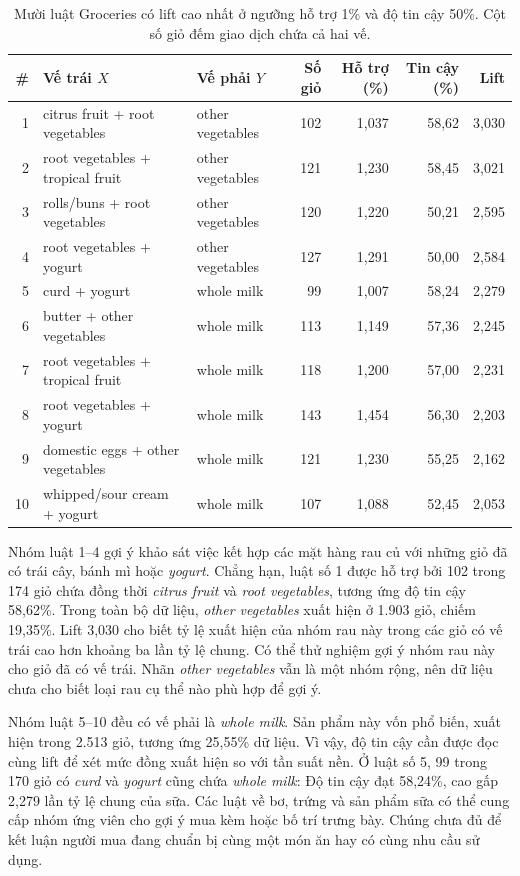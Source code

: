 \begin{table}[!t]
\caption{Mười luật Groceries có lift cao nhất ở ngưỡng hỗ trợ 1\% và độ tin cậy 50\%. Cột số giỏ đếm giao dịch chứa cả hai vế.}\label{tab:rules}
\centering\footnotesize
\begin{tabular}{rp{}p{}rrrr}\toprule
\# & Vế trái $X$ & Vế phải $Y$ & Số giỏ & Hỗ trợ (\%) & Tin cậy (\%) & Lift \\\midrule
1 & citrus fruit + root vegetables & other vegetables & 102 & 1,037 & 58,62 & 3,030 \\
2 & root vegetables + tropical fruit & other vegetables & 121 & 1,230 & 58,45 & 3,021 \\
3 & rolls/buns + root vegetables & other vegetables & 120 & 1,220 & 50,21 & 2,595 \\
4 & root vegetables + yogurt & other vegetables & 127 & 1,291 & 50,00 & 2,584 \\
5 & curd + yogurt & whole milk & 99 & 1,007 & 58,24 & 2,279 \\
6 & butter + other vegetables & whole milk & 113 & 1,149 & 57,36 & 2,245 \\
7 & root vegetables + tropical fruit & whole milk & 118 & 1,200 & 57,00 & 2,231 \\
8 & root vegetables + yogurt & whole milk & 143 & 1,454 & 56,30 & 2,203 \\
9 & domestic eggs + other vegetables & whole milk & 121 & 1,230 & 55,25 & 2,162 \\
10 & whipped/sour cream + yogurt & whole milk & 107 & 1,088 & 52,45 & 2,053 \\
\bottomrule\end{tabular}
\end{table}

Nhóm luật 1--4 gợi ý khảo sát việc kết hợp các mặt hàng rau củ với
những giỏ đã có trái cây, bánh mì hoặc \textit{yogurt}. Chẳng hạn, luật số 1
được hỗ trợ bởi 102 trong 174 giỏ chứa đồng thời \textit{citrus fruit}
và \textit{root vegetables}, tương ứng độ tin cậy 58,62\%.
Trong toàn bộ dữ liệu, \textit{other vegetables} xuất hiện ở
1.903 giỏ, chiếm 19,35\%. Lift 3,030 cho biết tỷ lệ xuất hiện của
nhóm rau này trong các giỏ có vế trái cao hơn khoảng ba lần tỷ lệ
chung. Có thể thử nghiệm gợi ý nhóm rau này cho giỏ đã có vế trái.
Nhãn
\textit{other vegetables} vẫn là một nhóm rộng, nên dữ liệu chưa
cho biết loại rau cụ thể nào phù hợp để gợi ý.

Nhóm luật 5--10 đều có vế phải là \textit{whole milk}. Sản phẩm này
vốn phổ biến, xuất hiện trong 2.513 giỏ, tương ứng 25,55\% dữ liệu.
Vì vậy, độ tin cậy cần được đọc cùng lift để xét mức đồng xuất hiện
so với tần suất nền. Ở luật số 5, 99 trong 170 giỏ có
\textit{curd} và \textit{yogurt} cũng chứa \textit{whole milk}:
Độ tin cậy đạt 58,24\%, cao gấp 2,279 lần tỷ lệ chung của sữa.
Các luật về bơ, trứng và sản phẩm sữa có thể cung cấp nhóm ứng viên
cho gợi ý mua kèm hoặc bố trí trưng bày. Chúng chưa đủ để kết luận
người mua đang chuẩn bị cùng một món ăn hay có cùng nhu cầu sử dụng.

